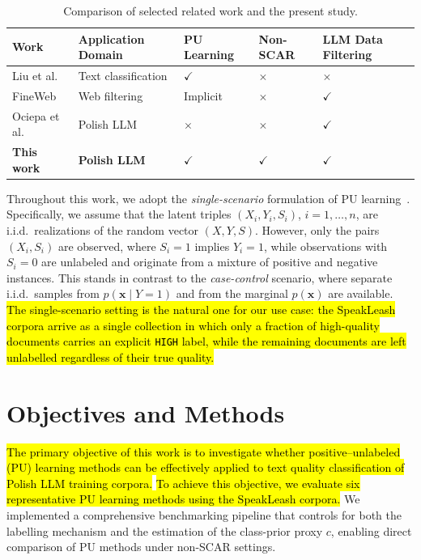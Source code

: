 \documentclass[applsci,article,submit,pdftex,moreauthors]{Definitions/mdpi}
\newcommand{\rev}[1]{\hl{#1}}
\begin{document}
\begin{table}[H]
\caption{Comparison of selected related work and the present study.}
\label{tab:novelty}
\centering
\begin{tabular}{lllll}
\toprule
\textbf{Work} &
\textbf{Application Domain} &
\textbf{PU Learning} &
\textbf{Non-SCAR} &
\textbf{LLM Data Filtering} \\
\midrule
Liu et al.      & Text classification & $\checkmark$ & $\times$ & $\times$ \\
FineWeb         & Web filtering       & Implicit     & $\times$ & $\checkmark$ \\
Ociepa et al.   & Polish LLM          & $\times$     & $\times$ & $\checkmark$ \\
\textbf{This work} & \textbf{Polish LLM} & \textbf{$\checkmark$} & \textbf{$\checkmark$} & \textbf{$\checkmark$} \\
\bottomrule
\end{tabular}
\end{table}

Throughout this work, we adopt the \emph{single-scenario} formulation of PU learning~\cite{bekker2020survey}. Specifically, we assume that the latent triples $(X_i,Y_i,S_i)$, $i=1,\ldots,n$, are i.i.d.\ realizations of the random vector $(X,Y,S)$. However, only the pairs $(X_i,S_i)$ are observed, where $S_i=1$ implies $Y_i=1$, while observations with $S_i=0$ are unlabeled and originate from a mixture of positive and negative instances. This stands in contrast to the \emph{case-control} scenario, where separate i.i.d.\ samples from $p(\mathbf{x}\mid Y=1)$ and from the marginal $p(\mathbf{x})$ are available. \rev{The single-scenario setting is the natural one for our use case: the SpeakLeash corpora arrive as a single collection in which only a fraction of high-quality documents carries an explicit \texttt{HIGH} label, while the remaining documents are left unlabelled regardless of their true quality.}

\section{Objectives and Methods}

\rev{The primary objective of this work is to investigate whether positive--unlabeled (PU) learning methods can be effectively applied to text quality classification of Polish LLM training corpora.} \rev{To achieve this objective, we evaluate six representative PU learning methods using the SpeakLeash corpora.} We implemented a comprehensive benchmarking pipeline that controls for both the labelling mechanism and the estimation of the class-prior proxy $c$, enabling direct comparison of PU methods under non-SCAR settings.
\end{document}
